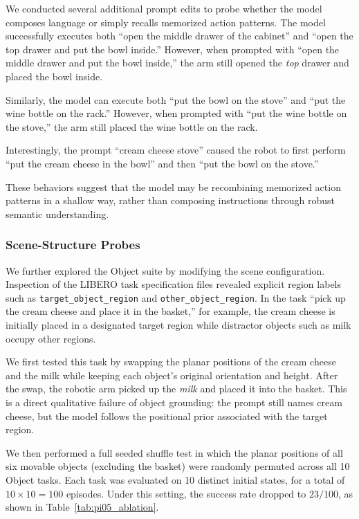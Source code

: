 \documentclass{article}
\begin{document}
We conducted several additional prompt edits to probe whether the model composes language or simply recalls memorized action patterns. The model successfully executes both ``open the middle drawer of the cabinet'' and ``open the top drawer and put the bowl inside.'' However, when prompted with ``open the middle drawer and put the bowl inside,'' the arm still opened the \emph{top} drawer and placed the bowl inside.

Similarly, the model can execute both ``put the bowl on the stove'' and ``put the wine bottle on the rack.'' However, when prompted with ``put the wine bottle on the stove,'' the arm still placed the wine bottle on the rack.

Interestingly, the prompt ``cream cheese stove'' caused the robot to first perform ``put the cream cheese in the bowl'' and then ``put the bowl on the stove.''

These behaviors suggest that the model may be recombining memorized action patterns in a shallow way, rather than composing instructions through robust semantic understanding.

\subsubsection{Scene-Structure Probes}

We further explored the Object suite by modifying the scene configuration. Inspection of the LIBERO task specification files revealed explicit region labels such as \texttt{target\_object\_region} and \texttt{other\_object\_region}. In the task ``pick up the cream cheese and place it in the basket,'' for example, the cream cheese is initially placed in a designated target region while distractor objects such as milk occupy other regions.

We first tested this task by swapping the planar positions of the cream cheese and the milk while keeping each object's original orientation and height. After the swap, the robotic arm picked up the \emph{milk} and placed it into the basket. This is a direct qualitative failure of object grounding: the prompt still names cream cheese, but the model follows the positional prior associated with the target region.

We then performed a full seeded shuffle test in which the planar positions of all six movable objects (excluding the basket) were randomly permuted across all 10 Object tasks. Each task was evaluated on 10 distinct initial states, for a total of \(10 \times 10 = 100\) episodes. Under this setting, the success rate dropped to \(23/100\), as shown in Table~\ref{tab:pi05_ablation}.
\end{document}
